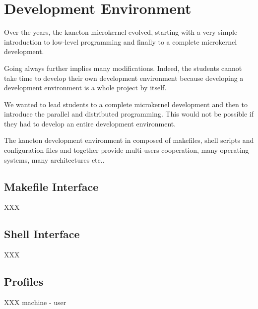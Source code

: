 
%
%

\chapter{Development Environment}

Over the years, the kaneton microkernel evolved, starting with a
very simple introduction to low-level programming and finally
to a complete microkernel development.

Going always further implies many modifications. Indeed, the students
cannot take time to develop their own development environment because
developing a development environment is a whole project by itself.

We wanted to lead students to a complete microkernel development and then
to introduce the parallel and distributed programming. This would not
be possible if they had to develop an entire development environment.

The kaneton development environment in composed of makefiles, shell
scripts and configuration files and together provide multi-users cooperation,
many operating systems, many architectures etc..

%
%

\section{Makefile Interface}

XXX

%
%

\section{Shell Interface}

XXX

%
%

\section{Profiles}

XXX machine - user
